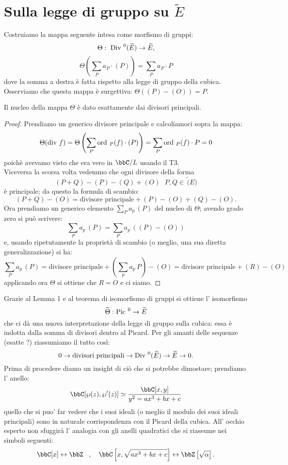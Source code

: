 \section{Sulla legge di gruppo su $\widetilde{E}$}
Costruiamo la mappa seguente intesa come morfismo di gruppi:
$$
\Theta: \ \mbox{Div }^0(\widetilde{E})\rightarrow \widetilde{E},
$$
$$
\Theta\left(\sum_P a_P \cdot (P)\right)=\sum_P a_P \cdot P
$$
dove la somma a destra è fatta rispetto alla legge di gruppo della cubica.
Osserviamo che questa mappa è surgettiva: $\Theta((P)-(O))=P$.
\begin{lemma}
Il nucleo della mappa $\Theta$ è dato esattamente dai divisori principali.
\end{lemma}
\begin{proof}
Prendiamo un generico divisore principale e calcoliamoci sopra la mappa:
$$
\Theta(\mbox{div } f)=\Theta\left(\sum_P \text{ord }_P(f) \cdot (P)\right)=\sum_P \text{ord }_P(f)\cdot P=0
$$
poichè avevamo visto che era vero in $\bbC/L$ usando il T3.\\
Viceversa la scorsa volta vedemmo che ogni divisore della forma
$$
(P+Q)-(P)-(Q)+(O)\ \ \ P,Q \in\, \widetilde(E)
$$
è principale; da questo la formula di scambio:
$$
(P+Q)-(O)=\mbox{divisore principale}+(P)-(O)+(Q)-(O).
$$
Ora prendiamo un generico elemento $\sum_P a_p\, (P)$ del nucleo di $\Theta$; avendo grado zero si può scrivere:
$$
\sum_P a_p\, (P)=\sum_P a_p\, ((P)-(O))
$$
e, usando ripetutamente la proprietà di scambio (o meglio, una sua diretta generalizzazione) si ha:
$$
\sum_P a_p\, (P)=\mbox{divisore principale}+ \left(\sum_p a_p\, P\right)-(O)=\mbox{divisore principale}+(R)-(O)
$$
applicando ora $\Theta$ si ottiene che $R=O$ e ci siamo.
\end{proof}
Grazie al Lemma 1 e al teorema di isomorfismo di gruppi si ottiene l' isomorfismo
$$
\widetilde{\Theta}: \mbox{Pic }^0 \rightarrow \widetilde{E}
$$
che ci dà una nuova interpretazione della legge di gruppo sulla cubica: essa è indotta dalla somma di divisori dentro al Picard. Per gli amanti delle sequenze (esatte ?) riassumiamo il tutto così:
$$
0\rightarrow\mbox{divisori principali}\rightarrow \mbox{Div }^0(\widetilde{E})\rightarrow \widetilde{E}\rightarrow 0.
$$
Prima di procedere diamo un insight di ciò che si potrebbe dimostare; prendiamo l' anello:
$$
\bbC[\wp(z),\wp'(z)]\simeq\frac{\bbC[x,y]}{y^2=ax^3+bx+c}
$$
quello che si puo' far vedere che i suoi ideali (o meglio il modulo dei suoi ideali principali) sono in naturale corrispondenza con il Picard della cubica. All' occhio esperto non sfuggirà l' analogia con gli anelli quadratici che si riassume nei simboli seguenti:
$$
\bbC[x] \leftrightarrow \bbZ\, \ \ , \ \ \ \bbC\left[x,\sqrt{ax^3+bx+c}\right] \leftrightarrow \bbZ\left[\sqrt{\alpha}\right].
$$ 
